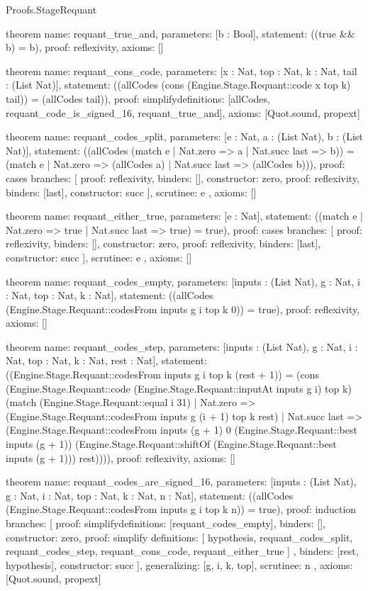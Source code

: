 \begin{lexlean}{Proofs.StageRequant}
\begin{semanticmodule}
theorem{
  name: requant_true_and,
  parameters: [b : Bool],
  statement: ((true && b) = b),
  proof: reflexivity{},
  axioms: []
}

theorem{
  name: requant_cons_code,
  parameters: [x : Nat, top : Nat, k : Nat, tail : (List Nat)],
  statement: ((allCodes (cons (Engine.Stage.Requant::code x top k) tail)) = (allCodes tail)),
  proof: simplify{definitions: [allCodes, requant_code_is_signed_16, requant_true_and]},
  axioms: [Quot.sound, propext]
}

theorem{
  name: requant_codes_split,
  parameters: [e : Nat, a : (List Nat), b : (List Nat)],
  statement: ((allCodes (match e
    | Nat.zero => a
    | Nat.succ last => b)) = (match e | Nat.zero => (allCodes a) | Nat.succ last => (allCodes b))),
  proof: cases{
    branches: [
      {proof: reflexivity{}, binders: [], constructor: zero},
      {proof: reflexivity{}, binders: [last], constructor: succ}
    ],
    scrutinee: e
  },
  axioms: []
}

theorem{
  name: requant_either_true,
  parameters: [e : Nat],
  statement: ((match e | Nat.zero => true | Nat.succ last => true) = true),
  proof: cases{
    branches: [
      {proof: reflexivity{}, binders: [], constructor: zero},
      {proof: reflexivity{}, binders: [last], constructor: succ}
    ],
    scrutinee: e
  },
  axioms: []
}

theorem{
  name: requant_codes_empty,
  parameters: [inputs : (List Nat), g : Nat, i : Nat, top : Nat, k : Nat],
  statement: ((allCodes (Engine.Stage.Requant::codesFrom inputs g i top k 0)) = true),
  proof: reflexivity{},
  axioms: []
}

theorem{
  name: requant_codes_step,
  parameters: [inputs : (List Nat), g : Nat, i : Nat, top : Nat, k : Nat, rest : Nat],
  statement: ((Engine.Stage.Requant::codesFrom inputs g i top k (rest + 1)) = (cons (Engine.Stage.Requant::code (Engine.Stage.Requant::inputAt inputs g i) top k) (match (Engine.Stage.Requant::equal i 31)
    | Nat.zero => (Engine.Stage.Requant::codesFrom inputs g (i + 1) top k rest)
    | Nat.succ last => (Engine.Stage.Requant::codesFrom inputs (g + 1) 0 (Engine.Stage.Requant::best inputs (g + 1)) (Engine.Stage.Requant::shiftOf (Engine.Stage.Requant::best inputs (g + 1))) rest)))),
  proof: reflexivity{},
  axioms: []
}

theorem{
  name: requant_codes_are_signed_16,
  parameters: [inputs : (List Nat), g : Nat, i : Nat, top : Nat, k : Nat, n : Nat],
  statement: ((allCodes (Engine.Stage.Requant::codesFrom inputs g i top k n)) = true),
  proof: induction{
    branches: [
      {proof: simplify{definitions: [requant_codes_empty]}, binders: [], constructor: zero},
      {
        proof: simplify{
          definitions: [
            hypothesis,
            requant_codes_split,
            requant_codes_step,
            requant_cons_code,
            requant_either_true
          ]
        },
        binders: [rest, hypothesis],
        constructor: succ
      }
    ],
    generalizing: [g, i, k, top],
    scrutinee: n
  },
  axioms: [Quot.sound, propext]
}


\end{semanticmodule}
\end{lexlean}
